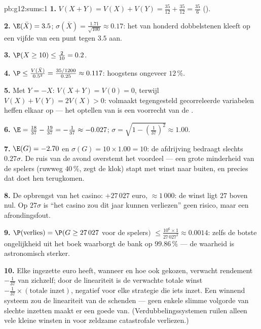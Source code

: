 \begin{solution}{pb:g12:sums:1}
\textbf{1.} $V(X + Y) = V(X) + V(Y) = \frac{35}{12} + \frac{35}{12} =
\frac{35}{6}$ ().

\textbf{2.} $\E(\bar X) = 3.5$; $\sigma(\bar X) = \frac{1.71}{\sqrt{100}}
\approx 0.17$: het  van honderd dobbelstenen kleeft op een vijfde
van een punt tegen $3.5$ aan.

\textbf{3.} $\P(X \geq 10) \leq \frac{2}{10} = 0.2$.

\textbf{4.} $\P \leq \frac{V(\bar X)}{0.5^2} = \frac{35/1200}{0.25} \approx
0.117$: hoogstens ongeveer $12\,\%$.

\textbf{5.} Met $Y = -X$: $V(X + Y) = V(0) = 0$, terwijl
$V(X) + V(Y) = 2V(X) > 0$: volmaakt tegengesteld gecorreleerde variabelen
heffen elkaar op --- het optellen van  is een voorrecht van de
.

\textbf{6.} $\E = \frac{18}{37} - \frac{19}{37} = -\frac{1}{37} \approx
-0.027$; $\sigma = \sqrt{1 - \left(\frac{1}{37}\right)^2} \approx 1.00$.

\textbf{7.} $\E(G) = -2.70$ en $\sigma(G) = 10 \times 1.00 = 10$: de
afdrijving bedraagt slechts $0.27\sigma$. De ruis van de avond overstemt het
voordeel --- een grote minderheid van de spelers (ruwweg $40\,\%$, zegt de
klok) stapt met winst naar buiten, en precies dat doet hen terugkomen.

\textbf{8.} De opbrengst van het casino:  $+27\,027$ euro,
 $\approx 1\,000$: de winst ligt $27$ 
boven nul. Op $27\sigma$ is ``het casino zou dit jaar kunnen verliezen'' geen
risico, maar een afrondingsfout.

\textbf{9.} $\P(\text{verlies}) = \P(G \geq 27\,027$ voor de spelers$)$
$\leq \frac{10^6 \times 1}{27\,027^2} \approx 0.0014$: zelfs de botste
ongelijkheid uit het boek waarborgt de bank op $99.86\,\%$ --- de waarheid is
astronomisch sterker.

\textbf{10.} Elke ingezette euro heeft, wanneer en hoe ook gekozen, verwacht
rendement $-\frac{1}{37}$ van zichzelf; door de lineariteit is de verwachte
totale winst $-\frac{1}{37} \times (\text{totale inzet})$, negatief voor elke
strategie die iets inzet. Een winnend systeem zou de lineariteit van de
 schenden --- geen enkele slimme volgorde van slechte
inzetten maakt er een goede van. (Verdubbelingssystemen ruilen alleen vele
kleine winsten in voor zeldzame catastrofale verliezen.)


\end{solution}
